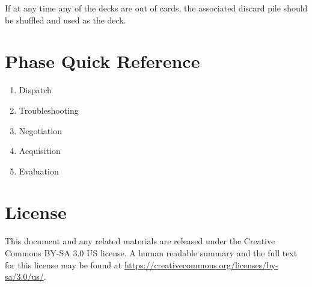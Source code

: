 \documentclass[twocolumn]{article}
\begin{document}
If at any time any of the decks are out of cards, the associated discard pile should be shuffled and used as the deck.

\section*{Phase Quick Reference}

\begin{enumerate}
	\item Dispatch
	\item Troubleshooting
	\item Negotiation
	\item Acquisition
	\item Evaluation
\end{enumerate}

\section*{License}

This document and any related materials are released under the Creative Commons BY-SA 3.0 US license. A human readable summary and the full text for this license may be found at \url{https://creativecommons.org/licenses/by-sa/3.0/us/}.
\end{document}
